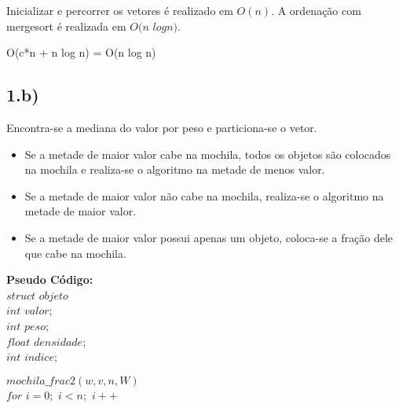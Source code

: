 \documentclass[10pt,a4paper]{article}
\begin{document}
	Inicializar e percorrer os vetores é realizado em $O(n)$. A ordenação com mergesort é realizada em $O(n$ $log n)$.\\
	
	\begin{center}
		O(c*n + n log n) = O(n log n)
\end{center}	 
	
	
	\subsection*{1.b)}
	
	\tab Encontra-se a mediana do valor por peso e particiona-se o vetor.\\
	
	\begin{itemize}
		\item Se a metade de maior valor cabe na mochila, todos os objetos são colocados na mochila e realiza-se o algoritmo na metade de menos valor. 
		
		\item Se a metade de maior valor não cabe na mochila, realiza-se o algoritmo na metade de maior valor.
		
		\item Se a metade de maior valor possui apenas um objeto, coloca-se a fração dele que cabe na mochila.
	\end{itemize}
	
	
	\textbf{Pseudo Código: }\\
	
	$struct$ $objeto${\\
	
	\hspace{1cm}$int$ $valor;$\\
	
	\hspace{1cm}$int$ $peso;$\\
	
	\hspace{1cm}$float$ $densidade;$\\
	
	\hspace{1cm}$int$ $indice;$\\
	
	}
	
	
	$mochila\_frac2 (w,v,n,W)$\\

	\hspace{1cm}$for$ $i=0;$ $i<n;$ $i++$\\
\end{document}
